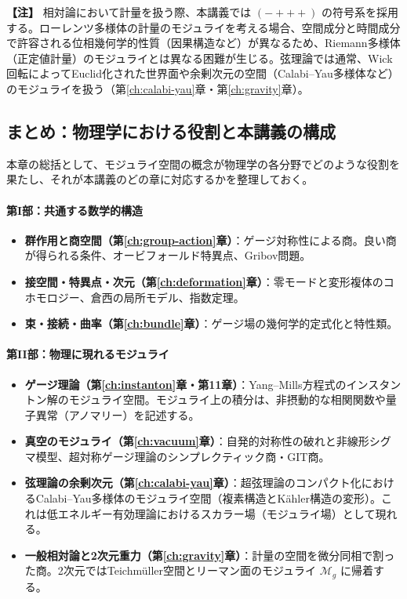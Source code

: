 \documentclass[uplatex, dvipdfmx, book]{jsbook}
\let\origsubsection\subsection
\let\origsubsubsection\subsubsection
\renewcommand{\section}{\origsubsection}
\renewcommand{\subsection}{\origsubsubsection}
\renewcommand{\subsubsection}{\paragraph}
\newenvironment{note}{\vspace{1ex}\par\footnotesize\noindent\textbf{【注】}}{\par\vspace{1ex}}
\begin{document}
\begin{note}
相対論において計量を扱う際、本講義では $(-+++)$ の符号系を採用する。ローレンツ多様体の計量のモジュライを考える場合、空間成分と時間成分で許容される位相幾何学的性質（因果構造など）が異なるため、Riemann多様体（正定値計量）のモジュライとは異なる困難が生じる。弦理論では通常、Wick回転によってEuclid化された世界面や余剰次元の空間（Calabi--Yau多様体など）のモジュライを扱う（第\ref{ch:calabi-yau}章・第\ref{ch:gravity}章）。
\end{note}

\section{まとめ：物理学における役割と本講義の構成}

本章の総括として、モジュライ空間の概念が物理学の各分野でどのような役割を果たし、それが本講義のどの章に対応するかを整理しておく。

\paragraph{第I部：共通する数学的構造}
\begin{itemize}
    \item \textbf{群作用と商空間（第\ref{ch:group-action}章）}：ゲージ対称性による商。良い商が得られる条件、オービフォールド特異点、Gribov問題。
    \item \textbf{接空間・特異点・次元（第\ref{ch:deformation}章）}：零モードと変形複体のコホモロジー、倉西の局所モデル、指数定理。
    \item \textbf{束・接続・曲率（第\ref{ch:bundle}章）}：ゲージ場の幾何学的定式化と特性類。
\end{itemize}

\paragraph{第II部：物理に現れるモジュライ}
\begin{itemize}
    \item \textbf{ゲージ理論（第\ref{ch:instanton}章・第11章）}：Yang--Mills方程式のインスタントン解のモジュライ空間。モジュライ上の積分は、非摂動的な相関関数や量子異常（アノマリー）を記述する。
    \item \textbf{真空のモジュライ（第\ref{ch:vacuum}章）}：自発的対称性の破れと非線形シグマ模型、超対称ゲージ理論のシンプレクティック商・GIT商。
    \item \textbf{弦理論の余剰次元（第\ref{ch:calabi-yau}章）}：超弦理論のコンパクト化におけるCalabi--Yau多様体のモジュライ空間（複素構造とK\"ahler構造の変形）。これは低エネルギー有効理論におけるスカラー場（モジュライ場）として現れる。
    \item \textbf{一般相対論と2次元重力（第\ref{ch:gravity}章）}：計量の空間を微分同相で割った商。2次元ではTeichm\"uller空間とリーマン面のモジュライ $\mathcal{M}_g$ に帰着する。
\end{itemize}
\end{document}
